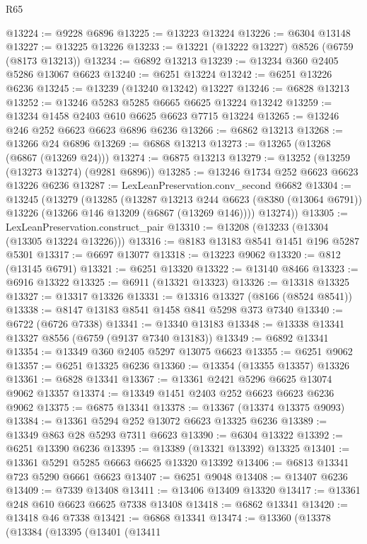 \begin{lexlean}{R65}
\begin{coremodule}
{@13224 := @9228 @6896
@13225 := @13223 @13224
@13226 := @6304 @13148
@13227 := @13225 @13226
@13233 := @13221 (@13222 @13227) @8526 (@6759 (@8173 @13213))
@13234 := @6892 @13213
@13239 := @13234 @360 @2405 @5286 @13067 @6623
@13240 := @6251 @13224
@13242 := @6251 @13226 @6236
@13245 := @13239 (@13240 @13242) @13227
@13246 := @6828 @13213
@13252 := @13246 @5283 @5285 @6665 @6625 @13224 @13242
@13259 := @13234 @1458 @2403 @610 @6625 @6623 @7715 @13224
@13265 := @13246 @246 @252 @6623 @6623 @6896 @6236
@13266 := @6862 @13213
@13268 := @13266 @24 @6896
@13269 := @6868 @13213
@13273 := @13265 (@13268 (@6867 (@13269 @24)))
@13274 := @6875 @13213
@13279 := @13252 (@13259 (@13273 @13274) (@9281 @6896))
@13285 := @13246 @1734 @252 @6623 @6623 @13226 @6236
@13287 := LexLeanPreservation.conv_second @6682
@13304 := @13245
    (@13279
      (@13285
        (@13287
          @13213
          @244
          @6623
          (@8380 (@13064 @6791))
          @13226
          (@13266 @146 @13209 (@6867 (@13269 @146))))
        @13274))
@13305 := LexLeanPreservation.construct_pair
@13310 := @13208 (@13233 (@13304 (@13305 @13224 @13226)))
@13316 := @8183 @13183 @8541 @1451 @196 @5287 @5301
@13317 := @6697 @13077
@13318 := @13223 @9062
@13320 := @812 (@13145 @6791)
@13321 := @6251 @13320
@13322 := @13140 @8466
@13323 := @6916 @13322
@13325 := @6911 (@13321 @13323)
@13326 := @13318 @13325
@13327 := @13317 @13326
@13331 := @13316 @13327 (@8166 (@8524 @8541))
@13338 := @8147 @13183 @8541 @1458 @841 @5298 @373 @7340
@13340 := @6722 (@6726 @7338)
@13341 := @13340 @13183
@13348 := @13338 @13341 @13327 @8556 (@6759 (@9137 @7340 @13183))
@13349 := @6892 @13341
@13354 := @13349 @360 @2405 @5297 @13075 @6623
@13355 := @6251 @9062
@13357 := @6251 @13325 @6236
@13360 := @13354 (@13355 @13357) @13326
@13361 := @6828 @13341
@13367 := @13361 @2421 @5296 @6625 @13074 @9062 @13357
@13374 := @13349 @1451 @2403 @252 @6623 @6623 @6236 @9062
@13375 := @6875 @13341
@13378 := @13367 (@13374 @13375 @9093)
@13384 := @13361 @5294 @252 @13072 @6623 @13325 @6236
@13389 := @13349 @863 @28 @5293 @7311 @6623
@13390 := @6304 @13322
@13392 := @6251 @13390 @6236
@13395 := @13389 (@13321 @13392) @13325
@13401 := @13361 @5291 @5285 @6663 @6625 @13320 @13392
@13406 := @6813 @13341 @723 @5290 @6661 @6623
@13407 := @6251 @9048
@13408 := @13407 @6236
@13409 := @7339 @13408
@13411 := @13406 @13409 @13320
@13417 := @13361 @248 @610 @6623 @6625 @7338 @13408
@13418 := @6862 @13341
@13420 := @13418 @46 @7338
@13421 := @6868 @13341
@13474 := @13360
    (@13378
      (@13384
        (@13395
          (@13401
            (@13411
}
\end{coremodule}
\end{lexlean}
